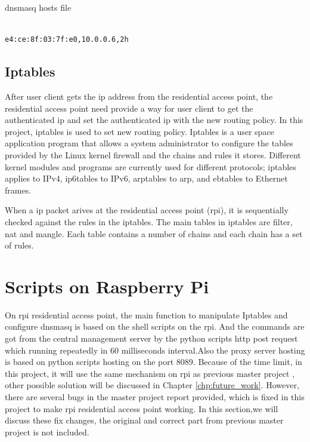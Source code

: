 \begin{algorithm}[h]
  \caption{dnsmasq hosts file}
  \label{code:dnsmasq_hosts}
  \begin{verbatim}
  
e4:ce:8f:03:7f:e0,10.0.0.6,2h
 \end{verbatim}
\end{algorithm}

\subsection{Iptables}
\par After user client gets the \gls{ip} address from the residential access point, the residential access point need provide a way for user client to get the authenticated \gls{ip} and set the authenticated \gls{ip} with the new routing policy. In this project, iptables\cite{iptables} is used to set new routing policy. Iptables is a user space application program that allows a system administrator to configure the tables provided by the Linux kernel firewall and the chains and rules it stores. Different kernel modules and programs are currently used for different protocols; iptables applies to IPv4, ip6tables to IPv6, arptables to \gls{arp}, and ebtables to Ethernet frames.
\par When a \gls{ip} packet arives at the residential access point (\gls{rpi}), it is sequentially checked against the rules in the iptables. The main tables in iptables are filter, nat and mangle. Each table contains a number of chains and each chain has a set of rules.

\section{Scripts on Raspberry Pi}
\label{sec:scripts_rpi}
\par On \gls{rpi} residential access point, the main function to manipulate Iptables and configure dnsmasq is based on the shell scripts on the \gls{rpi}. And the commands are got from the central management server by the python scripts \gls{http} post request which running repeatedly in 60 milliseconds interval.Also the proxy server hosting is based on python scripts hosting on the port 8089. Because of the time limit, in this project, it will use the same mechanism on \gls{rpi} as previous master project \cite{TorgeirMR}, other possible solution will be discussed in Chapter \ref{chp:future_work}. However, there are several bugs in the master project report provided, which is fixed in this project to make \gls{rpi} residential access point working. In this section,we will discuss these fix changes, the original and correct part from previous master project is not included.
